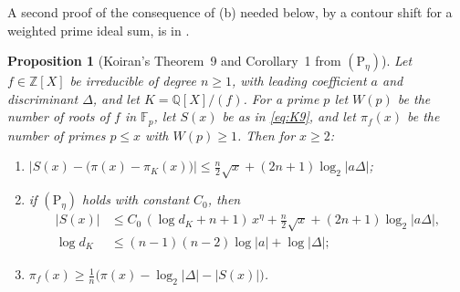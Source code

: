 \documentclass[11pt]{amsart}
\newtheorem{proposition}[thm]{Proposition}
\theoremstyle{definition}
\theoremstyle{remark}
\newcommand{\Z}{\mathbb Z}
\newcommand{\Q}{\mathbb Q}
\newcommand{\F}{\mathbb F}
\newcommand{\Ph}[1]{(\mathrm P_{#1})}
\begin{document}
A second proof of the consequence of (b) needed below, by a contour shift for a weighted prime ideal sum, is in \cite[proof of Proposition~17.2]{N}.

\begin{proposition}[Koiran's Theorem~9 and Corollary~1 from $\Ph\eta$]\label{prop:K9}
Let $f\in\Z[X]$ be irreducible of degree $n\ge1$, with leading coefficient $a$ and discriminant $\Delta$, and let $K=\Q[X]/(f)$. For a prime $p$ let $W(p)$ be the number of roots of $f$ in $\F_p$, let $S(x)$ be as in \eqref{eq:K9}, and let $\pi_f(x)$ be the number of primes $p\le x$ with $W(p)\ge1$. Then for $x\ge2$:
\begin{enumerate}
\item $\bigl|S(x)-\bigl(\pi(x)-\pi_K(x)\bigr)\bigr|\le\frac n2\sqrt x+(2n+1)\log_2|a\Delta|$;
\item if $\Ph\eta$ holds with constant $C_0$, then
\begin{align*}
 |S(x)|&\le C_0\,(\log d_K+n+1)\,x^{\eta}+\tfrac n2\sqrt x+(2n+1)\log_2|a\Delta|,\\
 \log d_K&\le(n-1)(n-2)\log|a|+\log|\Delta|;
\end{align*}
\item $\pi_f(x)\ge\frac1n\bigl(\pi(x)-\log_2|\Delta|-|S(x)|\bigr)$.
\end{enumerate}
\end{proposition}
\end{document}
